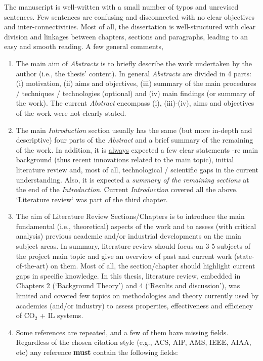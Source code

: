 \documentclass[14pt,twoside]{report}
\begin{document}
The manuscript is well-written with a small number of typos and unrevised sentences. Few sentences are confusing and disconnected with no clear objectives and inter-connectivities. Most of all, the dissertation is well-structured with clear division and linkages between chapters, sections and paragraphs, leading to an easy and smooth reading.  A few general comments,
\begin{enumerate}
%
\item The main aim of {\it Abstracts} is to briefly describe the work undertaken by the author (i.e., the thesis' content). In general {\it Abstracts} are divided in 4 parts: (i) motivation, (ii) aims and objectives, (iii) summary of the main procedures / techniques / technologies (optional) and (iv) main findings (or summary of the work). The current {\it Abstract} encompass (i), (iii)-(iv), aims and objectives of the work were not clearly stated.
%
\item The main {\it Introduction} section usually has the same (but more in-depth and descriptive) four parts of the {\it Abstract} and a brief summary of the remaining of the work. In addition, it is \underline{always} expected a few clear statements -re main background (thus recent innovations related to the main topic), initial literature review and, most of all, technological / scientific gaps in the current understanding. Also, it is expected a {\it summary of the remaining sections} at the end of the {\it Introduction}.  Current {\it Introduction} covered all the above. `Literature review` was part of the third chapter.
%
\item The aim of Literature Review Sections/Chapters is to introduce the main fundamental (i.e., theoretical) aspects of the work and to assess (with critical analysis) previous academic and/or industrial developments on the main subject areas. In summary, literature review should focus on 3-5 subjects of the project main topic and give an overview of past and current work (state-of-the-art) on them. Most of all, the section/chapter should highlight current gaps in specific knowledge. In this thesis, literature review, embedded in Chapters 2 (`Background Theory') and 4 (`Results and discussion'), was limited and covered few topics on methodologies and theory currently used by academics (and/or industry) to assess properties, effectiveness and efficiency of CO$_{2}$ + IL systems.
%
\item Some references are repeated, and a few of them have missing fields. Regardless of the chosen citation style (e.g., ACS, AIP, AMS, IEEE, AIAA, etc) any reference {\bf must} contain the following fields: 

\end{enumerate}
\end{document}
